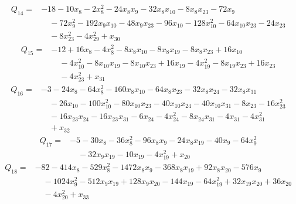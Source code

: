 \begin{equation*}\begin{split}
Q_{14}={}&-18 - 10x_{8} - 2x_{8}^{2} - 24x_{8} x_{9} - 32x_{8} x_{10} - 8x_{8} x_{23} - 72x_{9}\\
&\quad -72x_{9}^{2} - 192x_{9} x_{10} - 48x_{9} x_{23} - 96x_{10} - 128x_{10}^{2} - 64x_{10} x_{23} - 24x_{23}\\
&\quad -8x_{23}^{2} - 4x_{29}^{2} + x_{30}
\end{split}\end{equation*}
\begin{equation*}\begin{split}
Q_{15}={}&-12 + 16x_{8} - 4x_{8}^{2} - 8x_{8} x_{10} - 8x_{8} x_{19} - 8x_{8} x_{23} + 16x_{10}\\
&\quad -4x_{10}^{2} - 8x_{10} x_{19} - 8x_{10} x_{23} + 16x_{19} - 4x_{19}^{2} - 8x_{19} x_{23} + 16x_{23}\\
&\quad -4x_{23}^{2} + x_{31}
\end{split}\end{equation*}
\begin{equation*}\begin{split}
Q_{16}={}&-3 - 24x_{8} - 64x_{8}^{2} - 160x_{8} x_{10} - 64x_{8} x_{23} - 32x_{8} x_{24} - 32x_{8} x_{31}\\
&\quad -26x_{10} - 100x_{10}^{2} - 80x_{10} x_{23} - 40x_{10} x_{24} - 40x_{10} x_{31} - 8x_{23} - 16x_{23}^{2}\\
&\quad -16x_{23} x_{24} - 16x_{23} x_{31} - 6x_{24} - 4x_{24}^{2} - 8x_{24} x_{31} - 4x_{31} - 4x_{31}^{2}\\
&\quad + x_{32}
\end{split}\end{equation*}
\begin{equation*}\begin{split}
Q_{17}={}&-5 - 30x_{8} - 36x_{8}^{2} - 96x_{8} x_{9} - 24x_{8} x_{19} - 40x_{9} - 64x_{9}^{2}\\
&\quad -32x_{9} x_{19} - 10x_{19} - 4x_{19}^{2} + x_{20}
\end{split}\end{equation*}
\begin{equation*}\begin{split}
Q_{18}={}&-82 - 414x_{8} - 529x_{8}^{2} - 1472x_{8} x_{9} - 368x_{8} x_{19} + 92x_{8} x_{20} - 576x_{9}\\
&\quad -1024x_{9}^{2} - 512x_{9} x_{19} + 128x_{9} x_{20} - 144x_{19} - 64x_{19}^{2} + 32x_{19} x_{20} + 36x_{20}\\
&\quad -4x_{20}^{2} + x_{33}
\end{split}\end{equation*}
